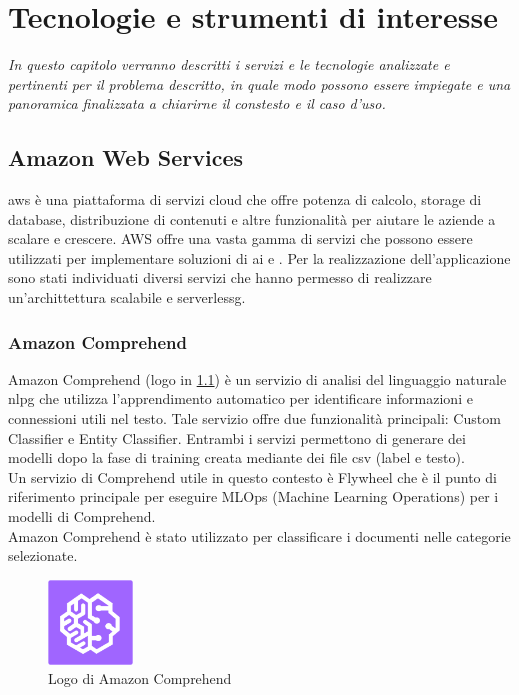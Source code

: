 \chapter{Tecnologie e strumenti di interesse}
\label{cap:tecnologie}
\emph{In questo capitolo verranno descritti i servizi e le tecnologie analizzate e pertinenti per il problema descritto, in quale modo possono essere impiegate e una panoramica finalizzata a chiarirne il constesto e il caso d'uso.}

\section{Amazon Web Services}
\gls{aws} è una piattaforma di servizi cloud che offre potenza di calcolo, storage di database, distribuzione di contenuti e altre funzionalità per aiutare le aziende a scalare e crescere. AWS offre una vasta gamma di servizi che possono essere utilizzati per implementare soluzioni di \gls{ai} e . Per la realizzazione dell'applicazione sono stati individuati diversi servizi che hanno permesso di realizzare un'archittettura scalabile e \gls{serverlessg}.

\subsection{Amazon Comprehend}
Amazon Comprehend (logo in \ref{fig:comprehend}) è un servizio di analisi del linguaggio naturale \gls{nlpg} che utilizza l'apprendimento automatico per identificare informazioni e connessioni utili nel testo. Tale servizio offre due funzionalità principali: Custom Classifier e Entity Classifier. 
Entrambi i servizi permettono di generare dei modelli dopo la fase di training creata mediante dei file csv (label e testo).\\
Un servizio di Comprehend utile in questo contesto è Flywheel che è il punto di riferimento principale per eseguire MLOps (Machine Learning Operations) per i modelli di Comprehend. \\
Amazon Comprehend è stato utilizzato per classificare i documenti nelle categorie selezionate. 

\begin{figure}[h]
  \centering
  \includegraphics[width=0.2\textwidth]{img/tecnologie/comprehend.png}
  \caption{Logo di Amazon Comprehend}
  \label{fig:comprehend}
\end{figure}


